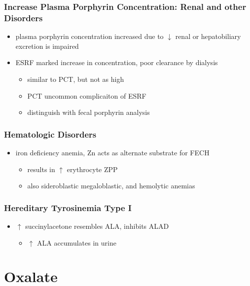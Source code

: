 \documentclass[12pt]{scrartcl}
\begin{document}
\subsubsection{Increase Plasma Porphyrin Concentration: Renal and other Disorders}
\label{sec:org2ceeb95}
\begin{itemize}
\item plasma porphyrin concentration increased due to \(\downarrow\) renal or
hepatobiliary excretion is impaired
\item ESRF marked increase in concentration, poor clearance by dialysis
\begin{itemize}
\item similar to PCT, but not as high
\item PCT uncommon complicaiton of ESRF
\item distinguish with fecal porphyrin analysis
\end{itemize}
\end{itemize}
\subsubsection{Hematologic Disorders}
\label{sec:org28aaa83}
\begin{itemize}
\item iron deficiency anemia, Zn acts as alternate substrate for FECH
\begin{itemize}
\item results in \(\uparrow\) erythrocyte ZPP
\item also sideroblastic megaloblastic, and hemolytic anemias
\end{itemize}
\end{itemize}
\subsubsection{Hereditary Tyrosinemia Type I}
\label{sec:org288e4d4}
\begin{itemize}
\item \(\uparrow\) succinylacetone resembles ALA, inhibits ALAD
\begin{itemize}
\item \(\uparrow\) ALA accumulates in urine
\end{itemize}
\end{itemize}
\section{Oxalate}
\label{sec:org9a634e2}
\end{document}
